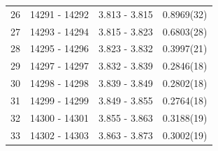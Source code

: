 \begin{table}
\begin{tabular}{r l c l}
26 & 14291 - 14292 & 3.813 - 3.815 & 0.8969(32) \\
27 & 14293 - 14294 & 3.815 - 3.823 & 0.6803(28) \\
28 & 14295 - 14296 & 3.823 - 3.832 & 0.3997(21) \\
29 & 14297 - 14297 & 3.832 - 3.839 & 0.2846(18) \\
30 & 14298 - 14298 & 3.839 - 3.849 & 0.2802(18) \\
31 & 14299 - 14299 & 3.849 - 3.855 & 0.2764(18) \\
32 & 14300 - 14301 & 3.855 - 3.863 & 0.3188(19) \\
33 & 14302 - 14303 & 3.863 - 3.873 & 0.3002(19) \\

\end{tabular}
\end{table}
